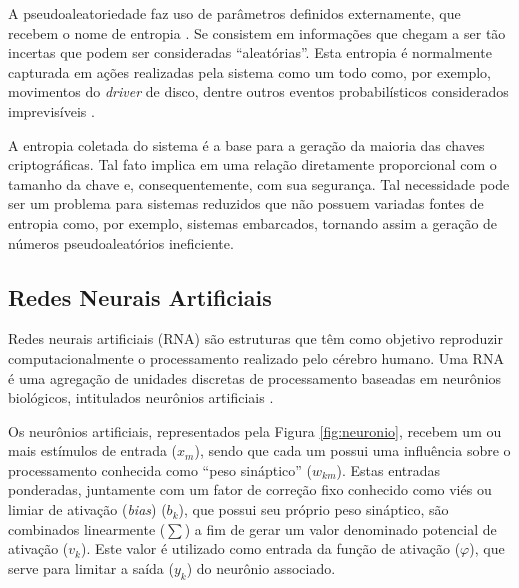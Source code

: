\documentclass[12pt]{article}
\begin{document}
            A pseudoaleatoriedade faz uso de parâmetros definidos externamente, que recebem o nome de entropia \cite{ristenpart2010randomness}. Se consistem em informações que chegam a ser tão incertas que podem ser consideradas ``aleatórias''. Esta entropia é normalmente capturada em ações realizadas pela sistema como um todo como, por exemplo, movimentos do \textit{driver} de disco, dentre outros eventos probabilísticos considerados imprevisíveis \cite{young2004malicious}.
            
            A entropia coletada do sistema é a base para a geração da maioria das chaves criptográficas. Tal fato implica em uma relação diretamente proporcional com o tamanho da chave e, consequentemente, com sua segurança. Tal necessidade pode ser um problema para sistemas reduzidos que não possuem variadas fontes de entropia como, por exemplo, sistemas embarcados, tornando assim a geração de números pseudoaleatórios ineficiente.
            
        \subsection{Redes Neurais Artificiais}
        \label{subsec:redes_neurais}
        
            Redes neurais artificiais (RNA) são estruturas que têm como objetivo reproduzir computacionalmente o processamento realizado pelo cérebro humano. Uma RNA é uma agregação de unidades discretas de processamento baseadas em neurônios biológicos, intitulados neurônios artificiais \cite{aragao2018antispam}.
            
            
            
            Os neurônios artificiais, representados pela Figura \ref{fig:neuronio}, recebem um ou mais estímulos de entrada ($x_m$), sendo que cada um possui uma influência sobre o processamento conhecida como ``peso sináptico'' ($w_{km}$). Estas entradas ponderadas, juntamente com um fator de correção fixo conhecido como viés ou limiar de ativação (\textit{bias}) ($b_k$), que possui seu próprio peso sináptico, são combinados linearmente ($\sum$) a fim de gerar um valor denominado potencial de ativação ($v_k$). Este valor é utilizado como entrada da função de ativação ($\varphi$), que serve para limitar a saída ($y_k$) do neurônio associado.
            
\end{document}
